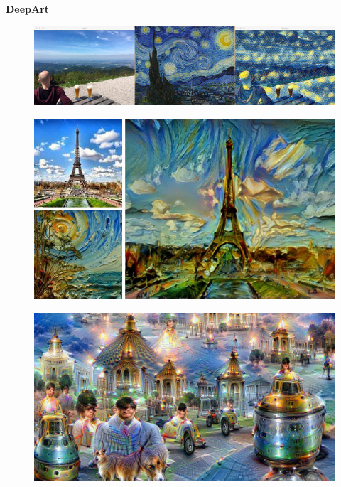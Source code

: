 \documentclass[xcolor=dvipsnames]{beamer}
\begin{document}
\begin{frame}{\bf DeepArt}

\begin{figure}
  \includegraphics[scale=0.2]{../../pictures/nn_art_00.jpg}
\end{figure}

\begin{figure}
  \includegraphics[scale=0.2]{../../pictures/nn_art_01.jpg}
\end{figure}

\begin{figure}
  \includegraphics[scale=0.15]{../../pictures/nn_art_02.jpg}
\end{figure}

\end{frame}
\end{document}
